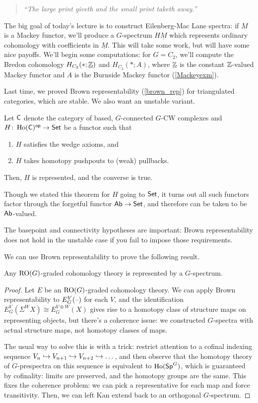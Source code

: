 \begin{quote}\textit{
	``The large print giveth and the small print taketh away.''
}\end{quote}
The big goal of today's lecture is to construct Eilenberg-Mac Lane spectra: if $\underline M$ is a Mackey functor,
we'll produce a $G$-spectrum $H\underline M$ which represents ordinary cohomology with coefficients in $\underline
M$. This will take some work, but will have some nice payoffs. We'll begin some computations: for $G = C_2$, we'll
compute the Bredon cohomology $H_{C_2}(*;\underline{\mathbb Z})$ and $H_{C_2}(*;A)$, where $\underline{\mathbb Z}$ is the
constant $\mathbb Z$-valued Mackey functor and $A$ is the Burnside Mackey functor (\cref{Mackeyexm}).

Last time, we proved Brown representability (\cref{brown_rep}) for triangulated categories, which are stable. We
also want an unstable variant.
\begin{thm}
Let $\mathsf C$ denote the category of based, $G$-connected $G$-CW complexes and $H\colon \operatorname{Ho}(\mathsf C)^{\mathsf{op}}\to\mathsf{Set}$ be a
functor such that
\begin{enumerate}
	\item $H$ satisfies the wedge axioms, and
	\item $H$ takes homotopy pushpouts to (weak) pullbacks.
\end{enumerate}
Then, $H$ is represented, and the converse is true.
\end{thm}
Though we stated this theorem for $H$ going to $\mathsf{Set}$, it turns out all such functors factor through the forgetful
functor $\mathsf{Ab}\to\mathsf{Set}$, and therefore can be taken to be $\mathsf{Ab}$-valued.
\begin{warn}
The basepoint and connectivity hypotheses are important: Brown representability does not hold in the unstable case
if you fail to impose those requirements.
\end{warn}
We can use Brown representability to prove the following result.
\begin{prop}
Any $\mathrm{RO}(G)$-graded cohomology theory is represented by a $G$-spectrum.
\end{prop}
\begin{proof}
Let $E$ be an $\mathrm{RO}(G)$-graded cohomology theory. We can apply Brown representability to $E_G^V(\text{--})$ for each $V$,
and the identification $E_G^V(\Sigma^W X)\cong E_G^{V\oplus W}(X)$ gives rise to a homotopy class of structure maps
on representing objects, but there's a coherence issue: we constructed $G$-spectra with actual structure maps, not
homotopy classes of maps.

The usual way to solve this is with a trick: restrict attention to a cofinal indexing sequence $V_n\hookrightarrow V_{n+1}\hookrightarrow
V_{n+2}\hookrightarrow\dots$, and then observe that the homotopy theory of $G$-prespectra on this sequence is equivalent to
$\operatorname{Ho}(\mathsf{Sp}^G)$, which is guaranteed by cofinality: limits are preserved, and the homotopy groups are the same. This
fixes the coherence problem: we can pick a representative for each map and force transitivity. Then, we can left
Kan extend back to an orthogonal $G$-spectrum.
\end{proof}
